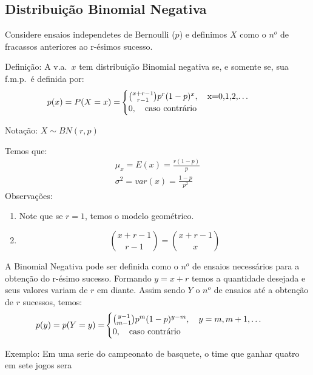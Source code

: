 \documentclass[11pt,a4paper]{book}
\begin{document}
      \subsection{Distribuição Binomial Negativa}
      \begin{description}
        \item  Considere ensaios independetes de Bernoulli ($p$) e definimos $X$ como o $n^o$ 
      de fracassos anteriores ao r-ésimos sucesso.

    \item{Definição}: A v.a.\ $x$ tem distribuição Binomial negativa se, e somente se,
      sua f.m.p.\ é definida por:
      \begin{align}
        p(x)=P(X=x)=&
        \begin{cases}
          \binom{x+r-1}{r-1} p^r (1-p)^x, \text{\quad x=0,1,2,\dots} \\
          0, \text{\quad caso contrário}
        \end{cases}
      \end{align}
    \begin{center}Notação: $X \mathtt{\sim}BN(r,p)$\end{center}
      Temos que: 
      \begin{align}
        \mu_{x}=E(x)=\frac{r(1-p)}{p} \\
        \sigma^2 = var(x)=\frac{1-p}{p^2}
      \end{align}
      Observações: 
      \begin{enumerate}
        \item Note que se $r=1$, temos o modelo geométrico.
        \item $$\binom{x+r-1}{r-1} = \binom{x+r-1}{x}$$
      \end{enumerate}
      A Binomial Negativa pode ser definida como o $n^o$ de ensaios necessários para 
      a obtenção do r-ésimo sucesso. Formando $y=x+r$ temos a quantidade desejada e 
      seus valores variam de $r$ em diante. Assim sendo $Y$ o $n^o$ de ensaios até 
      a obtenção de $r$ sucessos, temos: 
      \begin{align}
        p(y)=p(Y=y)=&\begin{cases}
          \binom{y-1}{m-1}p^m(1-p)^{y-m}, \text{\quad }y=m,m+1,\dots \\
          0, \text{\quad caso contrário}
        \end{cases}
      \end{align}
    \item{Exemplo}: Em uma serie do campeonato de basquete, o time que ganhar quatro em sete jogos sera

\end{description}
\end{document}
